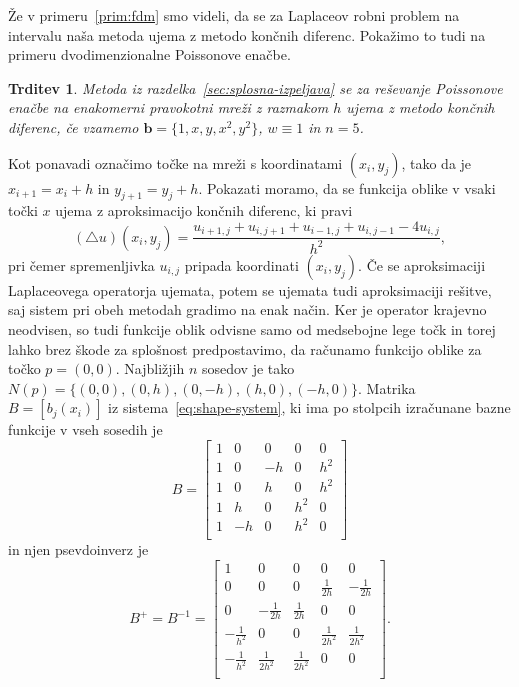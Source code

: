 \documentclass[a4paper,twoside]{article}
\theoremstyle{definition} %
\theoremstyle{plain} %
\newtheorem{trditev}[definicija]{Trditev}
\numberwithin{equation}{section}
\renewcommand{\b}{\boldsymbol}
\begin{document}
Že v primeru~\ref{prim:fdm} smo videli, da se za Laplaceov robni problem na
intervalu naša metoda ujema z metodo končnih diferenc. Pokažimo to tudi na
primeru dvodimenzionalne Poissonove enačbe.

\begin{trditev}
  \label{trd:eq-to-fdm}
  Metoda iz razdelka~\ref{sec:splosna-izpeljava} se za reševanje Poissonove
  enačbe na enakomerni pravokotni mreži z razmakom $h$ ujema z metodo končnih
  diferenc, če vzamemo $\b{b} = \{1, x, y, x^2, y^2\}$, $w \equiv 1$ in
  $n=5$.
\end{trditev}
\proof
Kot ponavadi označimo točke na mreži s koordinatami $(x_i, y_j)$, tako da je
$x_{i+1} = x_i + h$ in $y_{j+1} = y_j + h$.
Pokazati moramo, da se funkcija oblike v vsaki točki $x$ ujema z aproksimacijo
končnih diferenc,
ki pravi
\[
  (\triangle u)(x_i, y_j) = \frac{u_{i+1,j} + u_{i, j+1} + u_{i-1,j} + u_{i, j-1} -
  4u_{i,j}}{h^2},
\]
pri čemer spremenljivka $u_{i, j}$ pripada koordinati $(x_i, y_j)$. Če se
aproksimaciji Laplaceovega operatorja ujemata, potem se ujemata tudi
aproksimaciji rešitve, saj sistem pri obeh metodah gradimo na enak način.
Ker je operator krajevno neodvisen, so tudi funkcije oblik odvisne samo od
medsebojne lege točk in torej lahko brez škode
za splošnost predpostavimo, da računamo funkcijo oblike za točko
$p = (0, 0)$. Najbližjih $n$ sosedov je tako $N(p) = \{(0, 0), (0, h), (0, -h),
(h, 0), (-h, 0)\}$. Matrika $B = [b_j(x_i)]$ iz sistema~\eqref{eq:shape-system},
ki ima po stolpcih izračunane bazne funkcije v vseh sosedih je
\[
  B =
  \begin{bmatrix}
    1 & 0 & 0 & 0 & 0 \\
    1 & 0 & -h & 0 & h^2 \\
    1 & 0 & h & 0 & h^2 \\
    1 & h & 0 & h^2 & 0 \\
    1 & -h & 0 & h^2 & 0 \\
  \end{bmatrix}
\]
in njen psevdoinverz je
\[
  B^+ = B^{-1} =
  \begin{bmatrix}
     1 & 0 & 0 & 0 & 0 \\
 0 & 0 & 0 & \frac{1}{2 h} & -\frac{1}{2 h} \\
 0 & -\frac{1}{2 h} & \frac{1}{2 h} & 0 & 0 \\
 -\frac{1}{h^2} & 0 & 0 & \frac{1}{2 h^2} & \frac{1}{2 h^2} \\
 -\frac{1}{h^2} & \frac{1}{2 h^2} & \frac{1}{2 h^2} & 0 & 0 \\
  \end{bmatrix}.
\]
\end{document}

